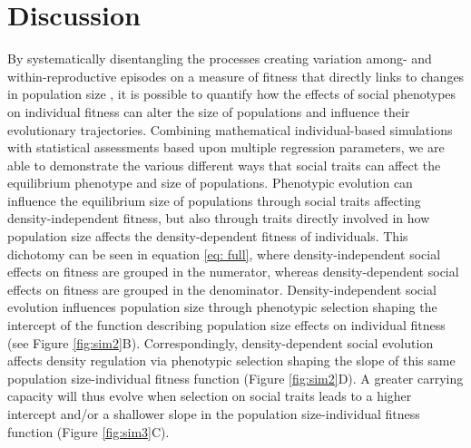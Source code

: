 \documentclass{article}
\begin{document}
\section{Discussion}
By systematically disentangling the processes creating variation among- and within-reproductive episodes on a measure of fitness that directly links to changes in population size \citep{Saether2015}, it is possible to quantify how the effects of social phenotypes on individual fitness can alter the size of populations and influence their evolutionary trajectories. Combining mathematical individual-based simulations with statistical assessments based upon multiple regression parameters, we are able to demonstrate the various different ways that social traits can affect the equilibrium phenotype and size of populations. Phenotypic evolution can influence the equilibrium size of populations through social traits affecting density-independent fitness, but also through traits directly involved in how population size affects the density-dependent fitness of individuals. This dichotomy can be seen in equation \ref{eq: full}, where density-independent social effects on fitness are grouped in the numerator, whereas density-dependent social effects on fitness are grouped in the denominator. Density-independent social evolution  influences population size through  phenotypic selection shaping the intercept of the function describing population size effects on individual fitness (see Figure \ref{fig:sim2}B). Correspondingly, density-dependent social evolution affects density regulation via phenotypic selection shaping the slope of this same population size-individual fitness function (Figure \ref{fig:sim2}D). A greater carrying capacity will thus evolve when selection on social traits leads to a higher intercept and/or a shallower slope in the population size-individual fitness function (Figure \ref{fig:sim3}C). 
\end{document}
